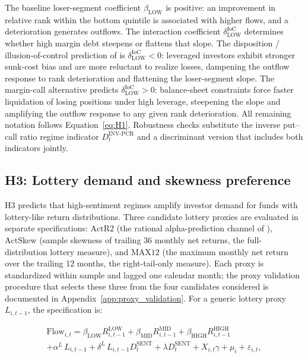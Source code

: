 \documentclass[12pt, oneside]{report}
\begin{document}
\noindent The baseline loser-segment coefficient $\beta_{\text{LOW}}$ is
positive: an improvement in relative rank within the bottom quintile
is associated with higher flows, and a deterioration generates
outflows. The interaction coefficient $\delta^{\text{IoC}}_{\text{LOW}}$
determines whether high margin debt steepens or flattens
that slope. The disposition / illusion-of-control prediction of
\textcite{ShefrinStatman1985} is $\delta^{\text{IoC}}_{\text{LOW}} < 0$:
leveraged investors exhibit stronger sunk-cost bias and are more
reluctant to realize losses, dampening the outflow response to rank
deterioration and flattening the loser-segment slope. The
\textcite{BrunnermeierPedersen2009} margin-call alternative predicts
$\delta^{\text{IoC}}_{\text{LOW}} > 0$: balance-sheet constraints force
faster liquidation of losing positions under high leverage,
steepening the slope and amplifying the outflow response to
any given rank deterioration. All remaining notation follows
Equation~\ref{eq:H1}. Robustness checks substitute the inverse
put--call ratio regime indicator $D^{\text{INV-PCR}}_t$ and a
discriminant version that includes both indicators jointly.

\subsection{H3: Lottery demand and skewness preference}
\label{sec:H3_method}

\noindent H3 predicts that high-sentiment regimes amplify investor
demand for funds with lottery-like return distributions. Three
candidate lottery proxies are evaluated in separate specifications:
$\text{ActR2}$ (the rational alpha-prediction channel of
\textcite{AmihudGoyenko2013}), $\text{ActSkew}$ (sample skewness of
trailing 36 monthly net returns, the full-distribution lottery
measure), and $\text{MAX12}$ (the maximum monthly net return over
the trailing 12 months, the right-tail-only measure). Each proxy is
standardized within sample and lagged one calendar month; the proxy
validation procedure that selects these three from the four
candidates considered is documented in
Appendix~\ref{app:proxy_validation}. For a generic lottery proxy
$L_{i,t-1}$, the specification is:

\begin{multline}
\text{Flow}_{i,t} =
  \beta_{\text{LOW}} R^{\text{LOW}}_{i,t-1}
+ \beta_{\text{MID}} R^{\text{MID}}_{i,t-1}
+ \beta_{\text{HIGH}} R^{\text{HIGH}}_{i,t-1} \\
+ \alpha^L\, L_{i,t-1}
+ \delta^L\, L_{i,t-1} D^{\text{SENT}}_t
+ \lambda D^{\text{SENT}}_t
+ X_{i,t} \gamma + \mu_i + \varepsilon_{i,t},
\label{eq:H3}
\end{multline}
\end{document}
